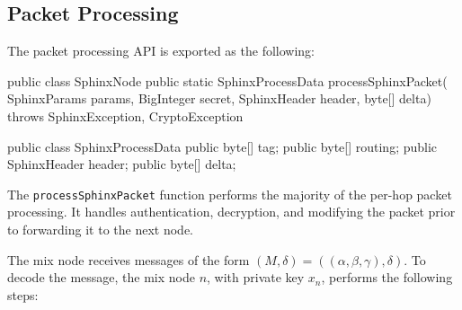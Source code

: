 \documentclass[final,dissertation.tex]{subfiles}
\begin{document}
%

\subsection{Packet Processing}

The packet processing API is exported as the following:

\begin{javacode}
public class SphinxNode {
    public static SphinxProcessData processSphinxPacket(
        SphinxParams params, 
        BigInteger secret, 
        SphinxHeader header, byte[] delta)
        throws SphinxException, CryptoException
}
\end{javacode}

\begin{javacode}
public class SphinxProcessData {
	public byte[] tag;
	public byte[] routing;
	public SphinxHeader header;
	public byte[] delta;
}
\end{javacode}

The \verb|processSphinxPacket| function performs the majority of the per-hop packet processing. It handles authentication, decryption, and modifying the packet prior to forwarding it to the next node.

The mix node receives messages of the form $(M, \delta) = ((\alpha, \beta, \gamma), \delta)$. To decode the message, the mix node $n$, with private key $x_n$, performs the following steps:
\end{document}
